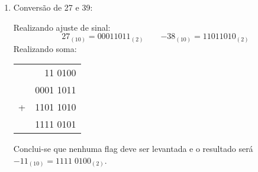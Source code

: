 \documentclass{article}
\begin{document}
\begin{resolution}
\begin{enumerate}
                    \item Conversão de 27 e 39:
                        \begin{figure}[H]
                            \centering
                        \end{figure}
                    Realizando ajuste de sinal:
                        \begin{equation*}
                            \boxed{ 27_{(10)} = 00011011_{(2)}}
                            \qquad
                            \boxed{-38_{(10)} = 11011010_{(2)}}
                        \end{equation*}
                    Realizando soma:
                        \begin{table}[H]
                            \centering  
                            \begin{tabular}[]{cr}
                                  &   11 0100\\
                                  & 0001 1011\\
                                + & 1101 1010\\\hline
                                  & 1111 0101\\
                            \end{tabular}
                        \end{table}
                    Conclui-se que nenhuma flag deve ser levantada e o resultado será $\boxed{-11_{(10)} = 1111\;0100_{(2)}}$.
\newpage


\end{enumerate}
\end{resolution}
\end{document}
